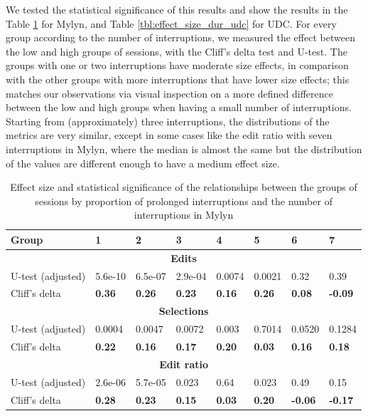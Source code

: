 \documentclass[times]{smrauth}
\begin{document}
We tested the statistical significance of this results and show the results in the Table \ref{tbl:effect_size_dur_mylyn} for Mylyn, and Table \ref{tbl:effect_size_dur_udc} for UDC. For every group according to the number of interruptions, we measured the effect between the low and high groups of sessions, with the Cliff's delta test and U-test. The groups with one or two interruptions have moderate size effects, in comparison with the other groups with more interruptions that have lower size effects; this matches our observations via visual inspection on a more defined difference between the low and high groups when having a small number of interruptions. Starting from (approximately) three interruptions, the distributions of the metrics are very similar, except in some cases like the edit ratio with seven interruptions in Mylyn, where the median is almost the same but the distribution of the values are different enough to have a medium effect size. 

\begin{table}[ht!]
	\tiny
	\renewcommand{\arraystretch}{1.3}
	\caption{Effect size and statistical significance of the relationships between the groups of sessions by proportion of prolonged interruptions and the number of interruptions in Mylyn}
	\label{tbl:effect_size_dur_mylyn}
	\centering
	\begin{tabular}{l | p{1cm} | p{1cm} | p{1cm} | p{1cm} | p{1cm} | p{1cm} | p{1cm}} 
		Group & 1 & 2 & 3 & 4 & 5 & 6 & 7  \\  
		\hline
		\multicolumn{8}{c}{\textbf{Edits}} \\
		\hline
		U-test (adjusted) & 5.6e-10 & 6.5e-07 & 2.9e-04 & 0.0074 & 0.0021 & 0.32 &  0.39\\
		\hline
		Cliff's delta & \textbf{0.36} & \textbf{0.26} & \textbf{0.23} & \textbf{0.16} & \textbf{0.26} & \textbf{0.08} & \textbf{-0.09} \\
		\hline
		
		\multicolumn{8}{c}{\textbf{Selections}} \\
		\hline 
		U-test (adjusted) & 0.0004 & 0.0047 & 0.0072 & 0.003 & 0.7014 & 0.0520 & 0.1284 \\
		\hline
		Cliff's delta & \textbf{0.22} & \textbf{0.16} & \textbf{0.17} & \textbf{0.20} & \textbf{0.03} & \textbf{0.16} & \textbf{0.18}  \\  
		\hline
		
		\multicolumn{8}{c}{\textbf{Edit ratio}} \\
		\hline 
		U-test (adjusted) & 2.6e-06 & 5.7e-05 & 0.023 & 0.64 & 0.023 & 0.49 & 0.15 \\
		\hline 
		Cliff's delta & \textbf{0.28} & \textbf{0.23} & \textbf{0.15} & \textbf{0.03} & \textbf{0.20} & \textbf{-0.06} & \textbf{-0.17}  \\
		\hline
		
	\end{tabular}
\end{table}
\end{document}
